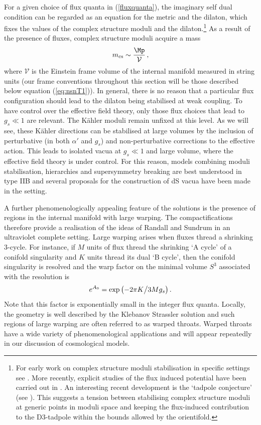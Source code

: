 For a given choice of flux quanta in  (\ref{fluxquanta}), the imaginary self dual condition can be regarded as an equation for the metric and the dilaton, which fixes the values of the complex structure moduli and the dilaton.\footnote{For early work
 on complex structure moduli stabilisation in specific settings  see \cite{Dasgupta:1999ss, hep-th/0201028, Frey:2002hf, hep-th/0312104, Giryavets:2004zr, Conlon:2004ds}.  More recently, explicit studies of the flux induced potential have been carried out in \cite{Cicoli:2022vny, Coudarchet:2022fcl}.  
 An interesting recent development  is the `tadpole conjecture' (see \cite{Bena:2020xrh, Marchesano:2021gyv, Plauschinn:2021hkp, Grana:2022dfw, Lust:2021xds, Lust:2022mhk, Becker:2022hse}). This suggests a tension between stabilising complex structure moduli at generic points in moduli space and keeping the flux-induced contribution to the D3-tadpole within the bounds allowed by the orientifold.}
As a result of the presence of fluxes, complex structure moduli acquire a mass
$$
m_{{\rm cs}} \sim { \Mp \over {\mathcal{V}}}\,, 
$$
where $\mathcal{V}$ is the Einstein frame volume of the internal manifold measured in string units (our frame conventions throughout this section will be those described below equation (\ref{eq:nsnT1})). In general, there is no reason that a particular flux configuration should lead to the dilaton being 
stabilised at weak coupling. To have control over the  effective field theory, only those flux choices that lead to $g_{s} \ll 1$ are relevant. The K\"ahler moduli remain unfixed at this level.  As we will see, these K\"ahler directions can be stabilised at  large volumes by the inclusion of perturbative (in both $\alpha'$ and $g_s$) and non-perturbative corrections to the effective action.  This leads to isolated vacua at  $g_{s} \ll 1$ and large volume,
 where the effective field theory is under control. For this reason, models combining moduli stabilisation, hierarchies and supersymmetry breaking are best understood in type IIB and several proposals for the construction of dS vacua have been made in the setting. 
 
A further phenomenologically appealing feature of the solutions is the presence of regions in the internal manifold with large warping.  The compactifications therefore provide a realisation of the ideas of Randall and Sundrum \cite{Randall:1999ee, Randall:1999vf} in an ultraviolet complete setting. Large warping arises when fluxes thread a shrinking 3-cycle. For instance, if $M$ units of flux thread the shrinking `A cycle' of a conifold
singularity and $K$ units thread its dual `B cycle', then the conifold singularity is resolved and the warp factor on the minimal volume $S^{3}$ associated with the resolution is
$$
  e^{A_{\rm 0}} =  {\rm{exp}} \left( -2\pi K \big{/} 3 M g_s \right).
$$
Note that this factor is exponentially small in the integer flux quanta.  Locally, the geometry is well described by the Klebanov Strassler solution \cite{Klebanov:2000hb} and such regions of large warping are often referred to as warped throats. Warped throats have a wide variety of phenomenological applications and will appear repeatedly in our discussion of cosmological models.
    
